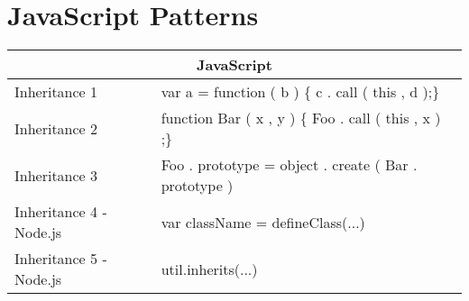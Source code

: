 \section{JavaScript Patterns}
\begin{tabular}{|p{5cm}|p{9cm}|}
	\hline
	\multicolumn{2}{|c|}{JavaScript}                                                                                                                                                                  \\ \hline
	Inheritance 1                  & var a = function ( b ) \{    c . call ( this , d );\}                                                                                      \\ \hline
	Inheritance 2                  & function Bar   ( x , y ) \{    Foo . call ( this , x ) ;\}                                                                                 \\ \hline
	Inheritance 3                  & Foo . prototype = object . create ( Bar . prototype )                                                                                      \\ \hline
	Inheritance 4 - Node.js        & var className = defineClass(...)                                                                                                           \\ \hline
	Inheritance 5 - Node.js        & util.inherits(...)                                                                                                                         \\ \hline
\end{tabular}